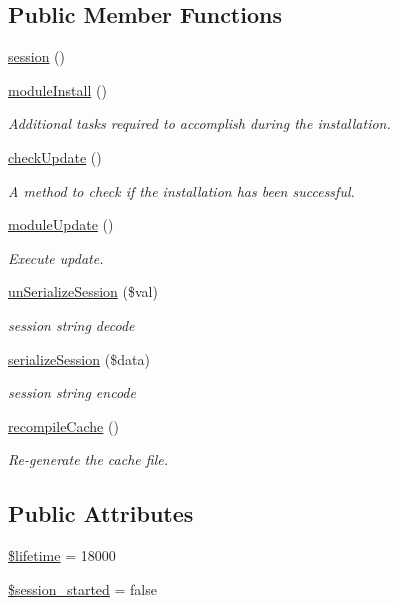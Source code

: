 \subsection*{Public Member Functions}
\begin{DoxyCompactItemize}
\item 
\hyperlink{classsession_a96fce5e6e2f2f0504cb1b9b4906ba379}{session} ()
\item 
\hyperlink{classsession_af6b13ec50160d63aca04f689e5cac9dd}{module\-Install} ()
\begin{DoxyCompactList}\small\item\em Additional tasks required to accomplish during the installation. \end{DoxyCompactList}\item 
\hyperlink{classsession_a30f6cc95b00bd35757aa882abce7ac34}{check\-Update} ()
\begin{DoxyCompactList}\small\item\em A method to check if the installation has been successful. \end{DoxyCompactList}\item 
\hyperlink{classsession_ad1eb77a85d7765620658071e49d16cff}{module\-Update} ()
\begin{DoxyCompactList}\small\item\em Execute update. \end{DoxyCompactList}\item 
\hyperlink{classsession_a97462709868f87d6cb050956c7b7da6d}{un\-Serialize\-Session} (\$val)
\begin{DoxyCompactList}\small\item\em session string decode \end{DoxyCompactList}\item 
\hyperlink{classsession_aea7dba13f8bc60c916840c66b2bc28ba}{serialize\-Session} (\$data)
\begin{DoxyCompactList}\small\item\em session string encode \end{DoxyCompactList}\item 
\hyperlink{classsession_a08f5190f8867dc2c0d5c23435b236f15}{recompile\-Cache} ()
\begin{DoxyCompactList}\small\item\em Re-\/generate the cache file. \end{DoxyCompactList}\end{DoxyCompactItemize}
\subsection*{Public Attributes}
\begin{DoxyCompactItemize}
\item 
\hyperlink{classsession_af73b8d0d1528237504be7b85f05c97ed}{\$lifetime} = 18000
\item 
\hyperlink{classsession_aae3391920555707a71e14e15f2929825}{\$session\-\_\-started} = false
\end{DoxyCompactItemize}


